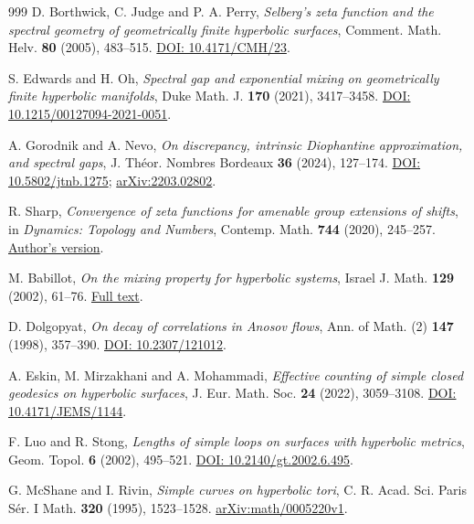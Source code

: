 \documentclass[11pt,a4paper]{article}
\numberwithin{equation}{section}
\theoremstyle{definition}
\theoremstyle{remark}
\begin{document}
\begin{thebibliography}{999}
D. Borthwick, C. Judge and P. A. Perry,
\emph{Selberg's zeta function and the spectral geometry of
geometrically finite hyperbolic surfaces},
Comment. Math. Helv. \textbf{80} (2005), 483--515.
\href{https://doi.org/10.4171/CMH/23}{DOI: 10.4171/CMH/23}.

S. Edwards and H. Oh,
\emph{Spectral gap and exponential mixing on geometrically finite
hyperbolic manifolds},
Duke Math. J. \textbf{170} (2021), 3417--3458.
\href{https://doi.org/10.1215/00127094-2021-0051}{DOI: 10.1215/00127094-2021-0051}.

A. Gorodnik and A. Nevo,
\emph{On discrepancy, intrinsic Diophantine approximation, and spectral gaps},
J. Th\'eor. Nombres Bordeaux \textbf{36} (2024), 127--174.
\href{https://doi.org/10.5802/jtnb.1275}{DOI: 10.5802/jtnb.1275};
\href{https://arxiv.org/abs/2203.02802}{arXiv:2203.02802}.

R. Sharp,
\emph{Convergence of zeta functions for amenable group extensions of shifts},
in \emph{Dynamics: Topology and Numbers}, Contemp. Math. \textbf{744}
(2020), 245--257.
\href{https://warwick.ac.uk/fac/sci/maths/people/staff/richard_sharp/p2/zeta-infinite-convergence-revised.pdf}{Author's version}.

M. Babillot,
\emph{On the mixing property for hyperbolic systems},
Israel J. Math. \textbf{129} (2002), 61--76.
\href{https://www.math.utah.edu/~chaika/Babillot-Mixing}{Full text}.

D. Dolgopyat,
\emph{On decay of correlations in Anosov flows},
Ann. of Math. (2) \textbf{147} (1998), 357--390.
\href{https://doi.org/10.2307/121012}{DOI: 10.2307/121012}.

A. Eskin, M. Mirzakhani and A. Mohammadi,
\emph{Effective counting of simple closed geodesics on hyperbolic surfaces},
J. Eur. Math. Soc. \textbf{24} (2022), 3059--3108.
\href{https://doi.org/10.4171/JEMS/1144}{DOI: 10.4171/JEMS/1144}.

F. Luo and R. Stong,
\emph{Lengths of simple loops on surfaces with hyperbolic metrics},
Geom. Topol. \textbf{6} (2002), 495--521.
\href{https://doi.org/10.2140/gt.2002.6.495}{DOI: 10.2140/gt.2002.6.495}.

G. McShane and I. Rivin,
\emph{Simple curves on hyperbolic tori},
C. R. Acad. Sci. Paris S\'er. I Math. \textbf{320} (1995), 1523--1528.
\href{https://arxiv.org/abs/math/0005220v1}{arXiv:math/0005220v1}.


\end{thebibliography}
\end{document}
